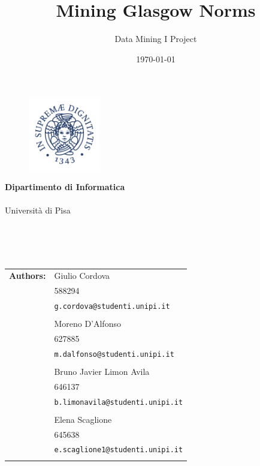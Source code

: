 \documentclass[a4paper,11pt,dvipsnames]{article}
\title{Mining Glasgow Norms}
\author{Data Mining I Project}
\date{\today}
\begin{document}
		\begin{titlepage}
			\thispagestyle{empty}
			\begin{figure}
				\includegraphics[width=31.5mm,right]{./Cherubino}
			\end{figure}
			\vspace*{-35mm}\hspace{-6mm}\textbf{\textcolor{blunipi}{\large{Dipartimento di Informatica}}}\\\\
			\textcolor{blunipi}{\large{Università di Pisa}}
			
			\vspace{30mm}
			\begin{center}
				\textcolor{blunipi}{\huge{\textbf{\thetitle}}}\\\vspace*{10mm}
				\textcolor{blunipi}{\theauthor}\\\vspace*{10mm}
				\textcolor{blunipi}{\thedate}\\\vspace*{20mm}


				\begin{tabular}{ll}
					\textbf{Authors:}
					
					& Giulio Cordova \\
					& 588294 \\
					& \texttt{g.cordova@studenti.unipi.it}\\\\
					
					& Moreno D'Alfonso \\
					& 627885 \\
					& \texttt{m.dalfonso@studenti.unipi.it}\\\\
					
					& Bruno Javier Limon Avila \\
					& 646137 \\
					& \texttt{b.limonavila@studenti.unipi.it}\\\\
					
					& Elena Scaglione \\
					& 645638 \\
					& \texttt{e.scaglione1@studenti.unipi.it}\\\\
					
					


					
				\end{tabular}
			\end{center}
		\end{titlepage}
\end{document}
